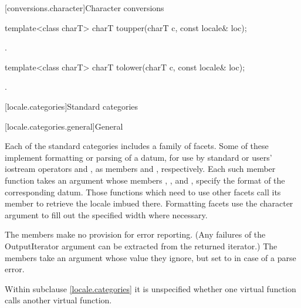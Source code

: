 [conversions.character]{Character conversions}

%
\begin{itemdecl}
template<class charT> charT toupper(charT c, const locale& loc);
\end{itemdecl}

\begin{itemdescr}
\pnum
\returns
{}.
\end{itemdescr}

%
\begin{itemdecl}
template<class charT> charT tolower(charT c, const locale& loc);
\end{itemdecl}

\begin{itemdescr}
\pnum
\returns
{}.
\end{itemdescr}

[locale.categories]{Standard  categories}

[locale.categories.general]{General}

\pnum
Each of the standard categories includes a family of facets.
Some of these implement formatting or parsing of a datum,
for use by standard or users' iostream operators \tcode{<<} and \tcode{>>},
as members  and , respectively.
Each such member function takes an
%
 argument whose members
%
,
%
,
and
%
,
specify the format of the corresponding datum.
Those functions which need to use other facets call its member 
to retrieve the locale imbued there.
Formatting facets use the character argument 
to fill out the specified width where necessary.

\pnum
The  members make no provision for error reporting.
(Any failures of the OutputIterator argument can be extracted from
the returned iterator.)
The  members take an  argument
whose value they ignore,
but set to  in case of a parse error.

\pnum
Within subclause \ref{locale.categories} it is unspecified whether
one virtual function calls another virtual function.

